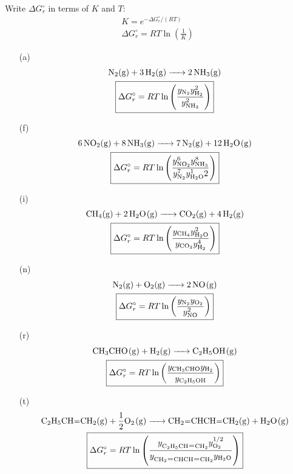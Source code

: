 \begin{solution}
  Write \(\Delta G_r^\circ\) in terms of \(K\) and \(T\):
  \begin{gather*}
    K = e^{-\Delta G_r^\circ/(RT)} \\
    \Delta G_r^\circ = RT\ln\left(\frac{1}{K}\right)
  \end{gather*}
  \begin{enumerate}
    \item[(a)]
      \begin{gather*}
        \ce{N2(g) + 3H2(g) -> 2NH3(g)} \\
        \boxed{\Delta G_r^\circ =
        RT\ln\left(\frac{y_{\ce{N2}}y_{\ce{H2}}^2}{y_{\ce{NH3}}^2}\right)}
      \end{gather*}
    \item[(f)]
      \begin{gather*}
        \ce{6NO2(g) + 8NH3(g) ->  7N2(g) +12H2O(g)} \\
        \boxed{\Delta G_r^\circ =
        RT\ln\left(\frac{y_{\ce{NO2}}^6y_{\ce{NH3}}^8}{y_{\ce{N2}}^7y_{\ce{H2O}}^12}\right)}
      \end{gather*}
    \item[(i)]
      \begin{gather*}
        \ce{CH4(g) + 2H2O(g) -> CO2(g) + 4H2(g)} \\
        \boxed{\Delta G_r^\circ =
        RT\ln\left(\frac{y_{\ce{CH4}}y_{\ce{H2O}}^2}{y_{\ce{CO2}}y_{\ce{H2}}^4}\right)}
      \end{gather*}
    \item[(n)]
      \begin{gather*}
        \ce{N2(g) + O2(g) -> 2NO(g)} \\
        \boxed{\Delta G_r^\circ =
        RT\ln\left(\frac{y_{\ce{N2}}y_{\ce{O2}}}{y_{\ce{NO}}^2}\right)}
      \end{gather*}
    \item[(r)]
      \begin{gather*}
        \ce{CH3CHO(g) + H2(g) -> C2H5OH(g)} \\
        \boxed{\Delta G_r^\circ =
        RT\ln\left(\frac{y_{\ce{CH3CHO}}y_{\ce{H2}}}{y_{\ce{C2H5OH}}}\right)}
      \end{gather*}
    \item[(t)]
      \begin{gather*}
        \ce{C2H5CH=CH2(g) + \frac{1}{2}O2(g) -> CH2=CHCH=CH2(g) + H2O(g)} \\
        \boxed{\Delta G_r^\circ =
        RT\ln\left(\frac{y_{\ce{C2H5CH=CH2}}y_{\ce{O2}}^{1/2}}{y_{\ce{CH2=CHCH=CH2}}y_{\ce{H2O}}}\right)}

\end{gather*}
\end{enumerate}
\end{solution}
